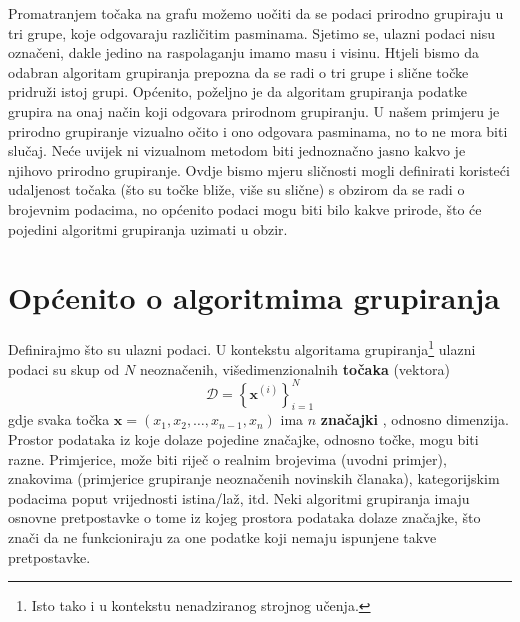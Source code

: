 \documentclass[times, utf8, zavrsni]{fer}
\begin{document}
Promatranjem točaka na grafu možemo uočiti da se podaci prirodno grupiraju u tri grupe, koje odgovaraju različitim pasminama. Sjetimo se, ulazni podaci nisu označeni, dakle jedino na raspolaganju imamo masu i visinu. Htjeli bismo da odabran algoritam grupiranja prepozna da se radi o tri grupe i slične točke pridruži istoj grupi. Općenito, poželjno je da algoritam grupiranja podatke grupira na onaj način koji odgovara prirodnom grupiranju. U našem primjeru je prirodno grupiranje vizualno očito i ono odgovara pasminama, no to ne mora biti slučaj. Neće uvijek ni vizualnom metodom biti jednoznačno jasno kakvo je njihovo prirodno grupiranje. Ovdje bismo mjeru sličnosti mogli definirati koristeći udaljenost točaka (što su točke bliže, više su slične) s obzirom da se radi o brojevnim podacima, no općenito podaci mogu biti bilo kakve prirode, što će pojedini algoritmi grupiranja uzimati u obzir.

\chapter{Općenito o algoritmima grupiranja}
Definirajmo što su ulazni podaci. U kontekstu algoritama grupiranja\footnote{Isto tako i u kontekstu nenadziranog strojnog učenja.} ulazni podaci su skup od $N$ neoznačenih, višedimenzionalnih \textbf{točaka} (vektora) \[\mathcal{D} = \left\{ \mathbf{x}^{(i)} \right\}_{i=1}^{N} \]
gdje svaka točka $\mathbf{x} = \left(x_1, x_2, \dots, x_{n-1}, x_n\right)$ ima $n$ \textbf{značajki} , odnosno dimenzija. Prostor podataka iz koje dolaze pojedine značajke, odnosno točke, mogu biti razne. Primjerice, može biti riječ o realnim brojevima (uvodni primjer), znakovima (primjerice grupiranje neoznačenih novinskih članaka), kategorijskim podacima poput vrijednosti istina/laž, itd. Neki algoritmi grupiranja imaju osnovne pretpostavke o tome iz kojeg prostora podataka dolaze značajke, što znači da ne funkcioniraju za one podatke koji nemaju ispunjene takve pretpostavke.
\end{document}
